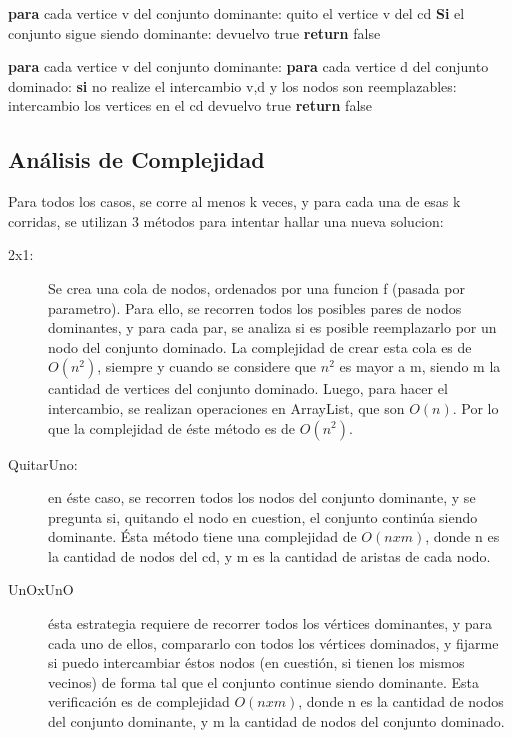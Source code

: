 \begin{codebox}
\li		\textbf{para} cada vertice v del conjunto dominante: \Do
\li			quito el vertice v del cd
\li			\textbf{Si} el conjunto sigue siendo dominante: \Do
\li				devuelvo true
\End
\End
\li \textbf{return} false
\end{codebox}

\begin{codebox}
\li		\textbf{para} cada vertice v del conjunto dominante: \Do
\li			\textbf{para} cada vertice d del conjunto dominado: \Do
\li				\textbf{si} no realize el intercambio v,d y los nodos son reemplazables: \Do
\li					intercambio los vertices en el cd
\li					devuelvo true
\End
\End
\End
\li \textbf{return} false
\end{codebox}

\subsection{Análisis de Complejidad}
Para todos los casos, se corre al menos k veces, y para cada una de esas k corridas, se utilizan 3 métodos para intentar hallar una nueva solucion:
\begin{description}
\item[2x1:] Se crea una cola de nodos, ordenados por una funcion f (pasada por parametro). Para ello, se recorren todos los posibles pares de nodos dominantes, y para cada par, se analiza si es posible reemplazarlo por un nodo del conjunto dominado. La complejidad de crear esta cola es de $O(n^2)$, siempre y cuando se considere que $n^2$ es mayor a m, siendo m la cantidad de vertices del conjunto dominado. Luego, para hacer el intercambio, se realizan operaciones en ArrayList, que son $O(n)$. Por lo que la complejidad de éste método es de $O(n^2)$.
\item[QuitarUno:] en éste caso, se recorren todos los nodos del conjunto dominante, y se pregunta si, quitando el nodo en cuestion, el conjunto continúa siendo dominante. Ésta método tiene una complejidad de $O(n x m)$, donde n es la cantidad de nodos del cd, y m es la cantidad de aristas de cada nodo.
 \item[UnOxUnO] ésta estrategia requiere de recorrer todos los vértices dominantes, y para cada uno de ellos, compararlo con todos los vértices dominados, y fijarme si puedo intercambiar éstos nodos (en cuestión, si tienen los mismos vecinos) de forma tal que el conjunto continue siendo dominante. Esta verificación es de complejidad $O(n x m)$, donde n es la cantidad de nodos del conjunto dominante, y m la cantidad de nodos del conjunto dominado.
\end{description}
 
